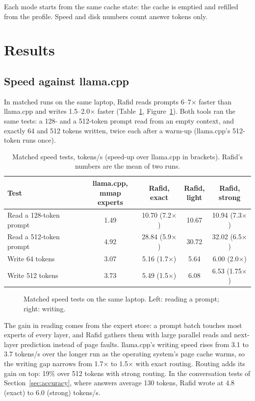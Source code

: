 Each mode starts from the same cache state: the cache is emptied and refilled from the profile. Speed and disk numbers count answer tokens only.

\section{Results}
\subsection{Speed against llama.cpp}
In matched runs on the same laptop, Rafid reads prompts 6--7$\times$ faster than llama.cpp and writes 1.5--2.0$\times$ faster (Table~\ref{tab:speed}, Figure~\ref{fig:speed}). Both tools ran the same tests: a 128- and a 512-token prompt read from an empty context, and exactly 64 and 512 tokens written, twice each after a warm-up (llama.cpp's 512-token runs once).

\begin{table}[t]
\centering\small
\caption{Matched speed tests, tokens/s (speed-up over llama.cpp in brackets). Rafid's numbers are the mean of two runs.}\label{tab:speed}
\begin{tabular}{lcccc}
\toprule
Test & \makecell{llama.cpp,\\mmap experts} & \makecell{Rafid,\\exact} & \makecell{Rafid,\\light} & \makecell{Rafid,\\strong} \\
\midrule
Read a 128-token prompt & 1.49 & 10.70 (7.2$\times$) & 10.67 & 10.94 (7.3$\times$) \\
Read a 512-token prompt & 4.92 & 28.84 (5.9$\times$) & 30.72 & 32.02 (6.5$\times$) \\
Write 64 tokens & 3.07 & 5.16 (1.7$\times$) & 5.64 & 6.00 (2.0$\times$) \\
Write 512 tokens & 3.73 & 5.49 (1.5$\times$) & 6.08 & 6.53 (1.75$\times$) \\
\bottomrule
\end{tabular}
\end{table}

\begin{figure}[t]
\centering

\caption{Matched speed tests on the same laptop. Left: reading a prompt; right: writing.}
\label{fig:speed}
\end{figure}

The gain in reading comes from the expert store: a prompt batch touches most experts of every layer, and Rafid gathers them with large parallel reads and next-layer prediction instead of page faults. llama.cpp's writing speed rises from 3.1 to 3.7 tokens/s over the longer run as the operating system's page cache warms, so the writing gap narrows from 1.7$\times$ to 1.5$\times$ with exact routing. Routing adds its gain on top: 19\% over 512 tokens with strong routing. In the conversation tests of Section~\ref{sec:accuracy}, where answers average 130 tokens, Rafid wrote at 4.8 (exact) to 6.0 (strong) tokens/s.
